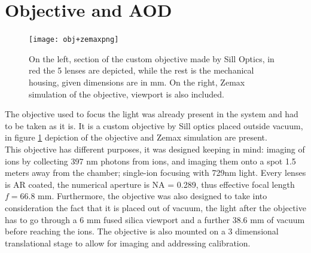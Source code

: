 \section{Objective and AOD}
\label{sec:obj}
%
\begin{figure}[H]
      \centering
          \centering
          \texttt{[image: obj+zemaxpng]}
           \caption{On the left, section of the custom objective made by Sill Optics, in red the 5 lenses are depicted, while the rest is the mechanical housing, given dimensions are in mm. On the right, Zemax simulation of the objective, viewport is also included.}
          \label{objsection}
\end{figure}
The objective used to focus the light was already present in the system and had to be taken as it is. It is a custom objective by Sill optics placed outside vacuum, in figure \ref{objsection} depiction of the objective and Zemax simulation are present.\\
This objective has different purposes, it was designed keeping in mind: imaging of ions by collecting 397 nm photons from ions, and imaging them onto a spot 1.5 meters away from the chamber; single-ion focusing with 729nm light. Every lenses is AR coated, the numerical aperture is NA = 0.289, thus effective focal length $f = 66.8$ mm. Furthermore, the objective was also designed to take into consideration the fact that it is placed out of vacuum, the light after the objective has to go through a 6 mm fused silica viewport and a further 38.6 mm of vacuum before reaching the ions. The objective is also mounted on a 3 dimensional translational stage to allow for imaging and addressing calibration.\\

